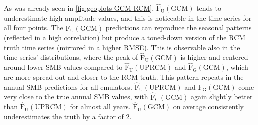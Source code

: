 \documentclass[a4paper,11pt,oneside]{report}
\begin{document}
As was already seen in \autoref{fig:geoplots-GCM-RCM}, $\mathrm{\hat{F}_{U}(GCM)}$ tends to underestimate high amplitude values, and this is noticeable in the time series for all four points. The $\mathrm{\hat{F}_{U}(GCM)}$ predictions can reproduce the seasonal patterns (reflected in a high correlation) but produce a toned-down version of the RCM truth time series (mirrored in a higher RMSE). This is observable also in the time series' distributions, where the peak of $\mathrm{\hat{F}_{U}(GCM)}$ is higher and centered around lower SMB values compared to $\mathrm{\hat{F}_{U}(UPRCM)}$ and $\mathrm{\hat{F}_{G}(GCM)}$, which are more spread out and closer to the RCM truth. This pattern repeats in the annual SMB predictions for all emulators. $\mathrm{\hat{F}_{U}(UPRCM)}$ and $\mathrm{\hat{F}_{G}(GCM)}$ come very close to the true annual SMB values, with $\mathrm{\hat{F}_{G}(GCM)}$ again slightly better than $\mathrm{\hat{F}_{U}(UPRCM)}$ for almost all years. $\mathrm{\hat{F}_{U}(GCM)}$ on average consistently underestimates the truth by a factor of 2. 
\end{document}
